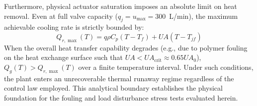 Furthermore, physical actuator saturation imposes an absolute limit on heat removal. Even at full valve capacity ($q_j = u_{\max} = 300$~L/min), the maximum achievable cooling rate is strictly bounded by:
\begin{equation}
    Q_{r, \max}(T) = q \rho C_p (T - T_f) + UA (T - T_{jf})
    \label{eq:max_cooling_limit}
\end{equation}
When the overall heat transfer capability degrades (e.g., due to polymer fouling on the heat exchange surface such that $UA < UA_{\text{crit}} \approx 0.65 UA_0$), $Q_g(T) > Q_{r, \max}(T)$ over a finite temperature interval. Under such conditions, the plant enters an unrecoverable thermal runaway regime regardless of the control law employed. This analytical boundary establishes the physical foundation for the fouling and load disturbance stress tests evaluated herein.
